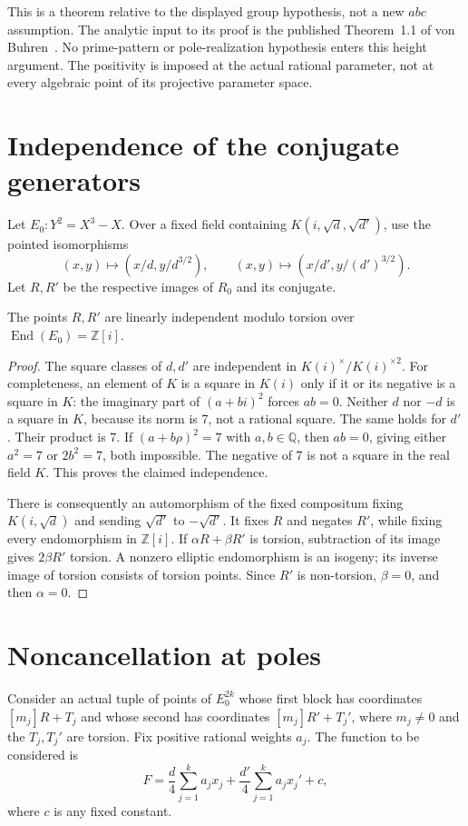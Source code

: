 \documentclass[11pt,a4paper]{article}
\newcommand{\Q}{\mathbb Q}\newcommand{\Z}{\mathbb Z}\DeclareMathOperator{\Tr}{Tr}
\begin{document}
This is a theorem relative to the displayed group hypothesis, not a new
$abc$ assumption. The analytic input to its proof is the published
Theorem~1.1 of von Buhren~\cite{VB}. No prime-pattern or pole-realization
hypothesis enters this height argument. The positivity is imposed at the
actual rational parameter, not at every algebraic point of its projective
parameter space.

\section{Independence of the conjugate generators}
Let $E_0:Y^2=X^3-X$. Over a fixed field containing $K(i,\sqrt d,\sqrt{d'})$,
use the pointed isomorphisms
\[
 (x,y)\longmapsto (x/d,y/d^{3/2}),\qquad
 (x,y)\longmapsto (x/d',y/(d')^{3/2}).
\]
Let $R,R'$ be the respective images of $R_0$ and its conjugate.

\begin{lemma}\label{lem:independent}
The points $R,R'$ are linearly independent modulo torsion over
$\operatorname{End}(E_0)=\Z[i]$.
\end{lemma}
\begin{proof}
The square classes of $d,d'$ are independent in $K(i)^\times/K(i)^{\times2}$.
For completeness, an element of $K$ is a square in $K(i)$ only if it or
its negative is a square in $K$: the imaginary part of $(a+bi)^2$
forces $ab=0$. Neither $d$ nor $-d$ is a square in $K$, because its
norm is 7, not a rational square. The same holds for $d'$. Their product
is 7. If $(a+b\rho)^2=7$ with $a,b\in\Q$, then $ab=0$, giving either
$a^2=7$ or $2b^2=7$, both impossible. The negative of 7 is not a square
in the real field $K$. This proves the claimed independence.

There is consequently an automorphism of the fixed compositum fixing
$K(i,\sqrt d)$ and sending $\sqrt{d'}$ to $-\sqrt{d'}$. It fixes $R$
and negates $R'$, while fixing every endomorphism in $\Z[i]$. If
$\alpha R+\beta R'$ is torsion, subtraction of its image gives
$2\beta R'$ torsion. A nonzero elliptic endomorphism is an isogeny;
its inverse image of torsion consists of torsion points. Since $R'$ is
non-torsion, $\beta=0$, and then $\alpha=0$.
\end{proof}

\section{Noncancellation at poles}
Consider an actual tuple of points of $E_0^{2k}$ whose first block has
coordinates $[m_j]R+T_j$ and whose second has coordinates
$[m_j]R'+T_j'$, where $m_j\ne0$ and the $T_j,T_j'$ are torsion. Fix
positive rational weights $a_j$. The function to be considered is
\[
 F=\frac d4\sum_{j=1}^k a_jx_j+
   \frac {d'}4\sum_{j=1}^k a_jx_j'+c,
\]
where $c$ is any fixed constant.
\end{document}

